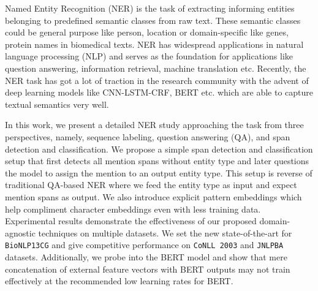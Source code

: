 Named Entity Recognition (NER) is the task of extracting informing entities belonging to predefined semantic classes from raw text. These semantic classes could be general purpose like person, location or domain-specific like genes, protein names in biomedical texts. NER has widespread applications in natural language processing (NLP) and serves as the foundation for applications like question answering, information retrieval, machine translation etc. Recently, the NER task has got a lot of traction in the research community with the advent of deep learning models like CNN-LSTM-CRF, BERT etc. which are able to capture textual semantics very well.

In this work, we present a detailed NER study approaching the task from three perspectives, namely, sequence labeling, question answering (QA), and span detection and classification. We propose a simple span detection and classification setup that first detects all mention spans without entity type and later questions the model to assign the mention to an output entity type. This setup is reverse of traditional QA-based NER where we feed the entity type as input and expect mention spans as output. We also introduce explicit pattern embeddings which help compliment character embeddings even with less training data. Experimental results demonstrate the effectiveness of our proposed domain-agnostic techniques on multiple datasets. We set the new state-of-the-art for \texttt{BioNLP13CG} and give competitive performance on \texttt{CoNLL 2003} and \texttt{JNLPBA} datasets. Additionally, we probe into the BERT model and show that mere concatenation of external feature vectors with BERT outputs may not train effectively at the recommended low learning rates for BERT.
